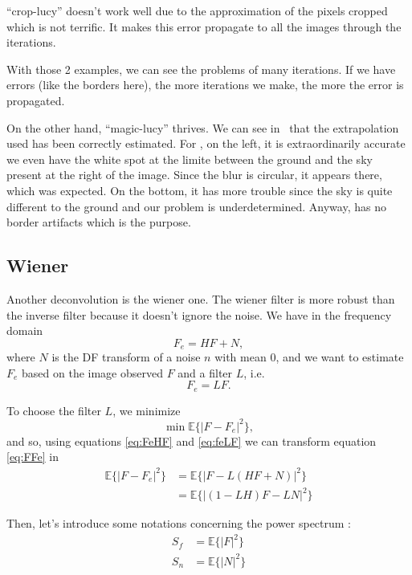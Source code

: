 ``crop-lucy'' doesn't work well due to the approximation of the pixels
cropped which is not terrific.
It makes this error propagate to all the images through the iterations.

With those 2 examples, we can see the problems of many iterations.
If we have errors (like the borders here), the more iterations
we make, the more the error is propagated.

On the other hand, ``magic-lucy'' thrives.
We can see in~
that the extrapolation used has been correctly estimated.
For ,
on the left, it is extraordinarily accurate we even have the white
spot at the limite between the ground and the sky present at the right of the image.
Since the blur is circular, it appears there, which was expected.
On the bottom, it has more trouble since the sky is quite different to the
ground and our problem is underdetermined.
Anyway,  has no border artifacts which
is the purpose.

\subsection{Wiener}
 Another deconvolution is the wiener one. The wiener filter is more robust than the inverse filter because it doesn't ignore the noise. We have in the frequency domain
\begin{equation}
F_e = HF + N,
\label{eq:FeHF}
\end{equation} 
 where $N$ is the DF transform of a noise $n$ with mean $0$, and we want to estimate $F_e$ based on the image observed $F$ and a filter $L$, i.e. 
 \begin{equation}
 F_e = LF.
 \label{eq:feLF}
 \end{equation}

To choose the filter $L$, we minimize 
\begin{equation}
\min \mathbb{E}\{|F - F_e|^2\},
\label{eq:FFe}
\end{equation}
and so, using equations \eqref{eq:FeHF} and \eqref{eq:feLF} we can transform equation \eqref{eq:FFe} in 
\begin{align}
\mathbb{E}\{|F - F_e|^2\} &= \mathbb{E}\{|F - L(HF+N)|^2\}\\
	&= \mathbb{E}\{|(1-LH)F - LN|^2\}
\end{align}

Then, let's introduce some notations concerning the power spectrum :
\begin{align}
S_f &= \mathbb{E}\{|F|^2\}\\
S_n &= \mathbb{E}\{|N|^2\}\\
\end{align}

